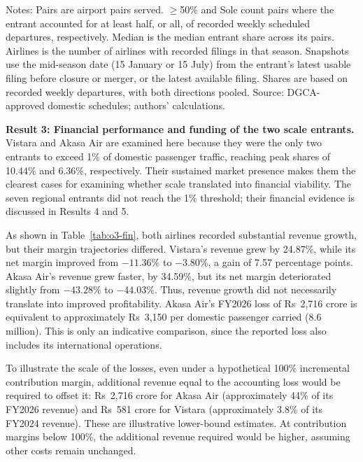 \documentclass[12pt,a4paper]{article}
\newenvironment{authorcontribution}[1]{\par\begingroup\colorlet{currentAuthor}{#1}\color{#1}\captionsetup{font+={color=#1}}}{\par\endgroup}
\begin{document}
\begin{authorcontribution}{authorSweta}
\begin{minipage}{\textwidth}
\begin{tabularx}{\textwidth}{|>{\raggedright\arraybackslash}p{}|>{\raggedright\arraybackslash}X|r|r|r|r|r|r|}
\end{tabularx}
\par\raggedright\footnotesize
Notes: Pairs are airport pairs served. $\geq$50\% and Sole count pairs where the entrant accounted for at least half, or all, of recorded weekly scheduled departures, respectively. Median is the median entrant share across its pairs. Airlines is the number of airlines with recorded filings in that season. Snapshots use the mid-season date (15 January or 15 July) from the entrant's latest usable filing before closure or merger, or the latest available filing. Shares are based on recorded weekly departures, with both directions pooled. Source: DGCA-approved domestic schedules; authors' calculations.
\end{minipage}\par\medskip

\textbf{Result 3: Financial performance and funding of the two scale entrants.} Vistara and Akasa Air are examined here because they were the only two entrants to exceed 1\% of domestic passenger traffic, reaching peak shares of 10.44\% and 6.36\%, respectively. Their sustained market presence makes them the clearest cases for examining whether scale translated into financial viability. The seven regional entrants did not reach the 1\% threshold; their financial evidence is discussed in Results 4 and 5.

As shown in Table~\ref{tab:o3-fin}, both airlines recorded substantial revenue growth, but their margin trajectories differed. Vistara's revenue grew by 24.87\%, while its net margin improved from $-11.36\%$ to $-3.80\%$, a gain of 7.57 percentage points. Akasa Air's revenue grew faster, by 34.59\%, but its net margin deteriorated slightly from $-43.28\%$ to $-44.03\%$. Thus, revenue growth did not necessarily translate into improved profitability. Akasa Air's FY2026 loss of Rs~2,716 crore is equivalent to approximately Rs~3,150 per domestic passenger carried (8.6 million). This is only an indicative comparison, since the reported loss also includes its international operations.

To illustrate the scale of the losses, even under a hypothetical 100\% incremental contribution margin, additional revenue equal to the accounting loss would be required to offset it: Rs~2,716 crore for Akasa Air (approximately 44\% of its FY2026 revenue) and Rs~581 crore for Vistara (approximately 3.8\% of its FY2024 revenue). These are illustrative lower-bound estimates. At contribution margins below 100\%, the additional revenue required would be higher, assuming other costs remain unchanged.


\end{authorcontribution}
\end{document}
